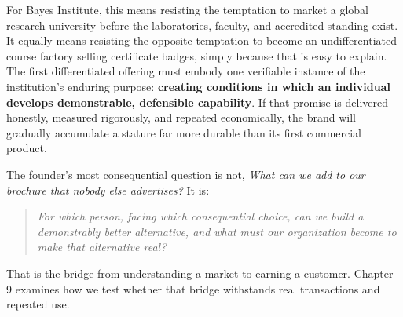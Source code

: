 For Bayes Institute, this means resisting the temptation to market a global research university before the laboratories, faculty, and accredited standing exist. It equally means resisting the opposite temptation to become an undifferentiated course factory selling certificate badges, simply because that is easy to explain. The first differentiated offering must embody one verifiable instance of the institution's enduring purpose: \textbf{creating conditions in which an individual develops demonstrable, defensible capability}. If that promise is delivered honestly, measured rigorously, and repeated economically, the brand will gradually accumulate a stature far more durable than its first commercial product.

The founder's most consequential question is not, \emph{What can we add to our brochure that nobody else advertises?} It is:

\begin{quote}
\emph{For which person, facing which consequential choice, can we build a demonstrably better alternative, and what must our organization become to make that alternative real?}
\end{quote}

That is the bridge from understanding a market to earning a customer. Chapter 9 examines how we test whether that bridge withstands real transactions and repeated use.
